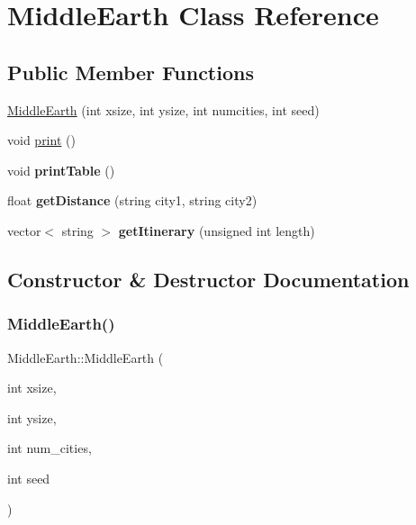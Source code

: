 \hypertarget{class_middle_earth}{}\section{Middle\+Earth Class Reference}
\label{class_middle_earth}
\subsection*{Public Member Functions}
\begin{DoxyCompactItemize}
\item 
\mbox{\hyperlink{class_middle_earth_ab7f5e0c9a33827812f435042e41e7800}{Middle\+Earth}} (int xsize, int ysize, int numcities, int seed)
\item 
void \mbox{\hyperlink{class_middle_earth_a5cb0956acbe5e39525e5061c9f3cc79b}{print}} ()
\item 
\mbox{\label{class_middle_earth_ae724794944d0ade7854047e779eb7054}} 
void {\bfseries print\+Table} ()
\item 
\mbox{\label{class_middle_earth_af558c23fd240638847105737faf755a3}} 
float {\bfseries get\+Distance} (string city1, string city2)
\item 
\mbox{\label{class_middle_earth_ad730d037c3946ec1129657fc5e0cb353}} 
vector$<$ string $>$ {\bfseries get\+Itinerary} (unsigned int length)
\end{DoxyCompactItemize}


\subsection{Constructor \& Destructor Documentation}
\mbox{\label{class_middle_earth_ab7f5e0c9a33827812f435042e41e7800}} 
\subsubsection{\texorpdfstring{Middle\+Earth()}{MiddleEarth()}}
{\footnotesize\ttfamily Middle\+Earth\+::\+Middle\+Earth (\begin{DoxyParamCaption}\item[{int}]{xsize,  }\item[{int}]{ysize,  }\item[{int}]{num\+\_\+cities,  }\item[{int}]{seed }\end{DoxyParamCaption})}

